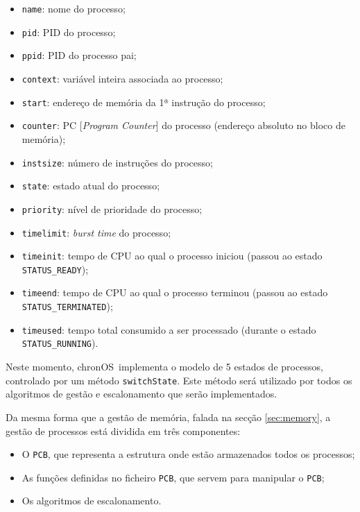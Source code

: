 \documentclass[a4paper,11pt,onecolumn,oneside]{article}
\newcommand{\chronOS}{\textsf{chronOS}}
\begin{document}
	\begin{itemize}
		\item \verb|name|: nome do processo;
		\item \verb|pid|: \ac{PID} do processo;
		\item \verb|ppid|: \ac{PID} do processo pai;
		\item \verb|context|: variável inteira associada ao processo;
		\item \verb|start|: endereço de memória da 1ª instrução do processo;
		\item \verb|counter|: PC [\textit{Program Counter}] do processo (endereço absoluto no bloco de memória);
		\item \verb|instsize|: número de instruções do processo;
		\item \verb|state|: estado atual do processo;
		\item \verb|priority|: nível de prioridade do processo;
		\item \verb|timelimit|: \textit{burst time} do processo;
		\item \verb|timeinit|: tempo de \ac{CPU} ao qual o processo iniciou (passou ao estado \texttt{STATUS\_READY});
		\item \verb|timeend|: tempo de \ac{CPU} ao qual o processo terminou (passou ao estado \texttt{STATUS\_TERMINATED});
		\item \verb|timeused|: tempo total consumido a ser processado (durante o estado \texttt{STATUS\_RUNNING}).
	\end{itemize}
	
	Neste momento, \chronOS~implementa o modelo de 5 estados de processos, controlado por um método \verb|switchState|. Este método será utilizado por todos os algoritmos de gestão e escalonamento que serão implementados.
	
	Da mesma forma que a gestão de memória, falada na secção \ref{sec:memory}, a gestão de processos está dividida em três componentes:
	
	\begin{itemize} %
	    \item O \texttt{\ac{PCB}}, que representa a estrutura onde estão armazenados todos os processos;
	    \item As funções definidas no ficheiro \texttt{\ac{PCB}}, que servem para manipular o \texttt{\ac{PCB}};
	    \item Os algoritmos de escalonamento.
	\end{itemize}  
	
\end{document}
